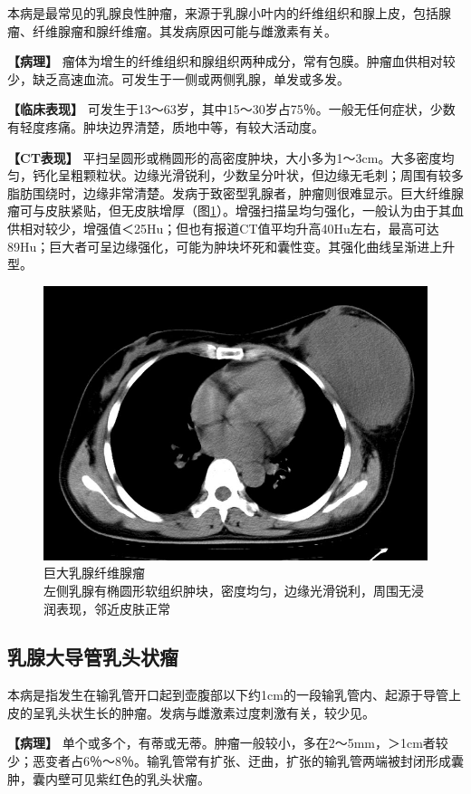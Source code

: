 本病是最常见的乳腺良性肿瘤，来源于乳腺小叶内的纤维组织和腺上皮，包括腺瘤、纤维腺瘤和腺纤维瘤。其发病原因可能与雌激素有关。

\textbf{【病理】}
瘤体为增生的纤维组织和腺组织两种成分，常有包膜。肿瘤血供相对较少，缺乏高速血流。可发生于一侧或两侧乳腺，单发或多发。

\textbf{【临床表现】}
可发生于13～63岁，其中15～30岁占75％。一般无任何症状，少数有轻度疼痛。肿块边界清楚，质地中等，有较大活动度。

\textbf{【CT表现】}
平扫呈圆形或椭圆形的高密度肿块，大小多为1～3cm。大多密度均匀，钙化呈粗颗粒状。边缘光滑锐利，少数呈分叶状，但边缘无毛刺；周围有较多脂肪围绕时，边缘非常清楚。发病于致密型乳腺者，肿瘤则很难显示。巨大纤维腺瘤可与皮肤紧贴，但无皮肤增厚（图\ref{fig9-49}）。增强扫描呈均匀强化，一般认为由于其血供相对较少，增强值＜25Hu；但也有报道CT值平均升高40Hu左右，最高可达89Hu；巨大者可呈边缘强化，可能为肿块坏死和囊性变。其强化曲线呈渐进上升型。

\begin{figure}[!htbp]
 \centering
 \includegraphics[width=.7\textwidth,height=\textheight,keepaspectratio]{./images/Image00247.jpg}
 \captionsetup{justification=centering}
 \caption{巨大乳腺纤维腺瘤\\{\small 左侧乳腺有椭圆形软组织肿块，密度均匀，边缘光滑锐利，周围无浸润表现，邻近皮肤正常}}
 \label{fig9-49}
  \end{figure} 

\subsection{乳腺大导管乳头状瘤}

本病是指发生在输乳管开口起到壶腹部以下约1cm的一段输乳管内、起源于导管上皮的呈乳头状生长的肿瘤。发病与雌激素过度刺激有关，较少见。

\textbf{【病理】}
单个或多个，有蒂或无蒂。肿瘤一般较小，多在2～5mm，＞1cm者较少；恶变者占6％～8％。输乳管常有扩张、迂曲，扩张的输乳管两端被封闭形成囊肿，囊内壁可见紫红色的乳头状瘤。

